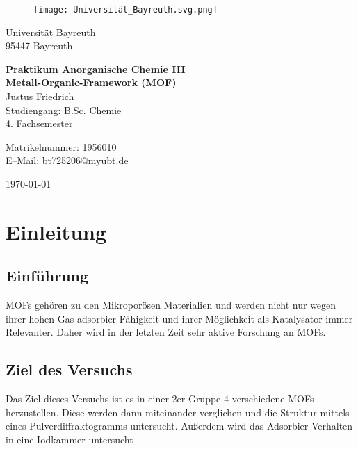 \documentclass[12pt, a4paper]{article}
\begin{document}
\begin{figure}
    \texttt{[image: Universität\_Bayreuth.svg.png]}
\end{figure}



{\raggedright Universität Bayreuth\\  95447 Bayreuth}


\vspace{5cm}

\begin{center}
{\LARGE\bf{Praktikum Anorganische Chemie III}} \\  
\vspace{1cm}
{\Large\bf{Metall-Organic-Framework (MOF)}}\\
\vspace{0.5cm}
{\large Justus Friedrich\\}
{Studiengang: B.Sc. Chemie\\}
{4. Fachsemester}
\end{center}





\thispagestyle{empty}
\begin{center}
{\small Matrikelnummer: 1956010 \\
E–Mail:  bt725206@myubt.de}
\end{center}

\vspace{5cm}

\today


\newpage
\tableofcontents
\thispagestyle{empty}


\newpage
\setcounter{page}{1}
\section{Einleitung}



\subsection{Einführung}
{MOFs gehören zu den Mikroporösen Materialien und werden nicht nur wegen ihrer hohen Gas adsorbier Fähigkeit und ihrer Möglichkeit als Katalysator 
immer Relevanter. Daher wird in der letzten Zeit sehr aktive Forschung an MOFs.\cite{ThomasHillman.2018}

}

\subsection{Ziel des Versuchs}
{Das Ziel dieses Versuchs ist es in einer 2er-Gruppe 4 verschiedene MOFs herzustellen. Diese werden dann miteinander verglichen und die Struktur mittels eines 
Pulverdiffraktogramms untersucht. Außerdem wird das Adsorbier-Verhalten in eine Iodkammer untersucht



}
\end{document}
